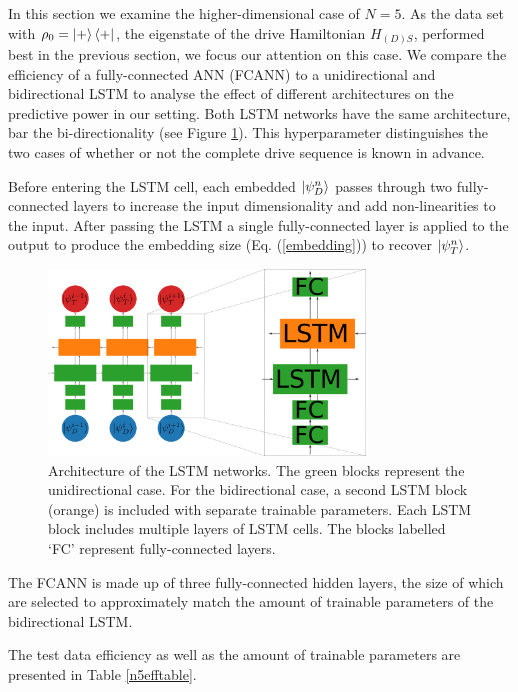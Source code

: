 In this section we examine the higher-dimensional case of $N=5$.
As the data set with $\rho_0 = \ket{+} \bra{+}$, the eigenstate of the drive Hamiltonian $H_{(D)S}$, performed best in the previous section, we focus our attention on this case.
We compare the efficiency of a fully-connected ANN (FCANN) to a unidirectional and bidirectional LSTM to analyse the effect of different architectures on the predictive power in our setting.
Both LSTM networks have the same architecture, bar the bi-directionality (see Figure \ref{lstm_network}).
This hyperparameter distinguishes the two cases of whether or not the complete drive sequence is known in advance.

Before entering the LSTM cell, each embedded $\ket{\psi_D^n}$ passes through two fully-connected layers to increase the input dimensionality and add non-linearities to the input.
After passing the LSTM a single fully-connected layer is applied to the output to produce the embedding size (Eq. (\ref{embedding})) to recover $\ket{\psi_T^n}$.

\begin{figure}[h]
	\centering
	\includegraphics[width=0.75\textwidth]{img/lstm_network}
	\caption{Architecture of the LSTM networks. The green blocks represent the unidirectional case. For the bidirectional case, a second LSTM block (orange) is included with separate trainable parameters. Each LSTM block includes multiple layers of LSTM cells. The blocks labelled `FC' represent fully-connected layers.}
	\label{lstm_network}
\end{figure}

The FCANN is made up of three fully-connected hidden layers, the size of which are selected to approximately match the amount of trainable parameters of the bidirectional LSTM.

The test data efficiency as well as the amount of trainable parameters are presented in Table \ref{n5efftable}.

